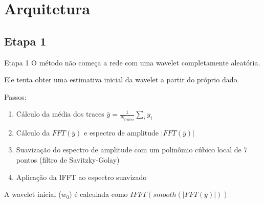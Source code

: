 \section{Arquitetura}
\subsection{Etapa 1}
\begin{frame}{Etapa 1}
    O método não começa a rede com uma wavelet completamente aleatória.

    Ele tenta obter uma estimativa inicial da wavelet a partir do próprio dado.
    
    Passos:
    \begin{enumerate}
        \item Cálculo da média dos traces $\bar{y} = \frac{1}{N_{traces}} \sum_{i}y_i$
        \item Cálculo da $FFT(\bar{y})$ e espectro de amplitude $|FFT(\bar{y})|$
        \item Suavização do espectro de amplitude com um polinômio cúbico local de 7 pontos (filtro de Savitzky-Golay)
        \item Aplicação da IFFT ao espectro suavizado
    \end{enumerate}

    A wavelet inicial ($w_0$) é calculada como $IFFT(smooth(|FFT(\bar{y})|))$


\end{frame}